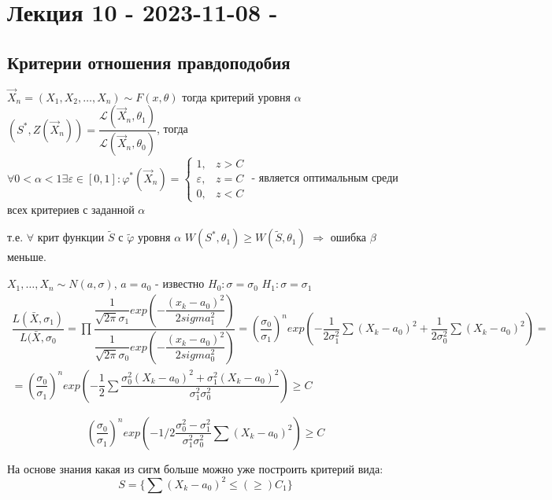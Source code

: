 \section{Лекция 10 - 2023-11-08 - }



\subsection{Критерии отношения правдоподобия}

\begin{theorem}
  $\vec{X}_n = (X_1, X_2,\dots, X_n) \sim F(x, \theta)$ тогда критерий уровня $\alpha$ $(S^*, Z(\vec{X}_n)) = \dfrac{\mathcal{L} (\vec{X}_n, \theta_1)}{\mathcal{L}(\vec{X}_n, \theta_0)}$, тогда $\forall 0 < \alpha < 1 \exists \varepsilon \in [0, 1] : \varphi^*(\vec{X}_n) = \begin{cases}
    1, &z > C \\
    \varepsilon, &z=C \\
    0, &z<C
  \end{cases}
  $ - является оптимальным среди всех критериев с заданной $\alpha$
  
  т.е. $\forall$ крит функции $\tilde S$ с $\tilde \varphi$ уровня $\alpha$ $W(S^*, \theta_1) \geqslant W(\tilde S, \theta_1)$ $\Rightarrow$ ошибка $\beta$ меньше.
\end{theorem}



\begin{ex}
  $X_1,\dots,X_n \sim N(a, \sigma)$, $a = a_0$ - известно
  $H_0 : \sigma = \sigma_0$
  $H_1 : \sigma = \sigma_1$
  \begin{multline*}
    \dfrac{L(\bar X, \sigma_1)}{L(\bar X, \sigma_0}
    = \prod \dfrac{\dfrac{1}{\sqrt{2\pi} \sigma_1} exp(- \dfrac{(x_k - a_0)^2}{2sigma_1^2})}{\dfrac{1}{\sqrt{2\pi} \sigma_0} exp(- \dfrac{(x_k - a_0)^2}{2sigma_0^2})}
    = (\dfrac{\sigma_0}{\sigma_1})^n exp(-\dfrac{1}{2\sigma_1^2} \sum (X_k-a_0)^2 + \dfrac{1}{2\sigma_0^2} \sum (X_k-a_0)^2 ) = \\
    = (\dfrac{\sigma_0}{\sigma_1})^n exp( -\dfrac{1}{2} \sum \dfrac{\sigma_0^2 (X_k-a_0)^2 + \sigma_1^2 (X_k - a_0)^2}{\sigma_1^2 \sigma_0^2} ) \geqslant C
  \end{multline*}

  \begin{equation*}
    (\dfrac{\sigma_0}{\sigma_1})^n exp(-1/2 \dfrac{\sigma_0^2 - \sigma_1^2}{\sigma_1^2 \sigma_0^2} \sum (X_k-a_0)^2) \geqslant C
  \end{equation*}

  На основе знания какая из сигм больше можно уже построить критерий вида:
  $$ S = \{ \sum(X_k-a_0)^2 \leqslant (\geqslant) C_1 \} $$
\end{ex}

